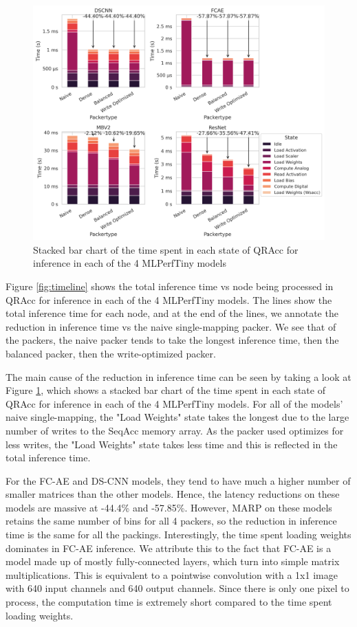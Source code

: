 \begin{figure}[htbp]
    \centering
    \includegraphics[width=\textwidth]{images/marp_qracc/time_bars.png}
    \caption{Stacked bar chart of the time spent in each state of QRAcc for inference in each of the 4 MLPerfTiny models}
    \label{fig:time_bars}
\end{figure}

Figure \ref{fig:timeline} shows the total inference time vs node being processed in QRAcc for inference in each of the 4 MLPerfTiny models. The lines show the total inference time for each node, and at the end of the lines, we annotate the reduction in inference time vs the naive single-mapping packer. We see that of the packers, the naive packer tends to take the longest inference time, then the balanced packer, then the write-optimized packer.

The main cause of the reduction in inference time can be seen by taking a look at Figure \ref{fig:time_bars}, which shows a stacked bar chart of the time spent in each state of QRAcc for inference in each of the 4 MLPerfTiny models. For all of the models' naive single-mapping, the "Load Weights" state takes the longest due to the large number of writes to the SeqAcc memory array. As the packer used optimizes for less writes, the "Load Weights" state takes less time and this is reflected in the total inference time. 

For the FC-AE and DS-CNN models, they tend to have much a higher number of smaller matrices than the other models. Hence, the latency reductions on these models are massive at -44.4\% and -57.85\%. However, MARP on these models retains the same number of bins for all 4 packers, so the reduction in inference time is the same for all the packings. Interestingly, the time spent loading weights dominates in FC-AE inference. We attribute this to the fact that FC-AE is a model made up of mostly fully-connected layers, which turn into simple matrix multiplications. This is equivalent to a pointwise convolution with a 1x1 image with 640 input channels and 640 output channels. Since there is only one pixel to process, the computation time is extremely short compared to the time spent loading weights.

